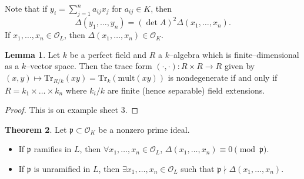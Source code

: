 \documentclass{article}
\theoremstyle{definition}
\newtheorem{theorem}{Theorem}[section]
\newtheorem{lemma}[theorem]{Lemma}
\begin{document}
Note that if $y_i = \sum_{j=1}^{n} a_{ij}x_j$ for $a_{ij} \in K$, then \[
\Delta(y_1,\ldots,y_n) = (\det A)^2\Delta(x_1,\ldots,x_n).
\]
If $x_1,\ldots,x_n \in \mathcal{O}_L$, then $\Delta(x_1,\ldots,x_n) \in \mathcal{O}_K$.
\begin{lemma}\label{lemma12.1}
    Let $k$ be a perfect field and $R$ a $k$--algebra which is finite--dimensional as a $k$--vector space. Then the trace form $(\cdot ,\cdot ) : R \times R \to R$ given by $(x,y) \mapsto \text{Tr}_{R/k}(xy) = \text{Tr}_k(\text{mult}(xy))$ is nondegenerate if and only if $R = k_1 \times \ldots \times k_n$ where $k_i/k$ are finite (hence separable) field extensions.
\end{lemma}
\begin{proof}
    This is on example sheet 3.
\end{proof}
\begin{theorem}
    Let $\mathfrak{p} \subset \mathcal{O}_K$ be a nonzero prime ideal.
    \begin{itemize}
        \item If $\mathfrak{p}$ ramifies in $L$, then $\forall x_1,\ldots,x_n \in \mathcal{O}_L$, $\Delta(x_1,\ldots,x_n) \equiv 0 \pmod{\mathfrak{p}}$.
        \item If $\mathfrak{p}$ is unramified in $L$, then $\exists x_1,\ldots,x_n \in \mathcal{O}_L$ such that $\mathfrak{p} \nmid \Delta(x_1,\ldots,x_n)$.
    \end{itemize}
\end{theorem}
\end{document}
